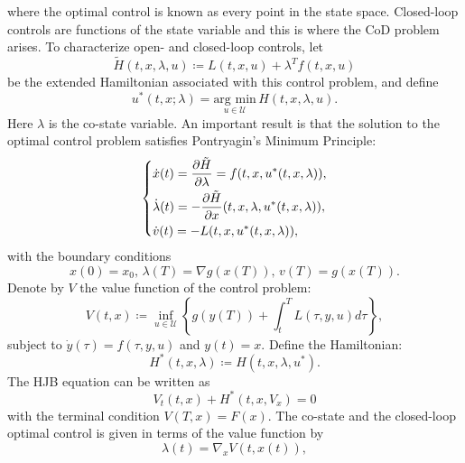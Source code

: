 \documentclass[12pt,AutoFakeBold,AutoFakeSlant]{article}
\theoremstyle{definition}
\newcommand{\bx}{{x}}
\newcommand{\be}{\begin{equation}}
\newcommand{\ee}{\end{equation}}
\newcommand{\del}{\partial}
\begin{document}
	where the optimal control is known as every point in the state space. Closed-loop controls are functions of the state variable
	and this is where the CoD problem arises.
	To characterize open- and closed-loop controls, let 
	\begin{equation}
	\label{eq: Hamiltonian}
	\tilde{ H} (t, x, \lambda, u) \coloneqq L (t, x, u) +  \lambda^T  f (t, x, u) 
	\end{equation}
	be the extended Hamiltonian associated with this control problem, and define
	\begin{equation} 
	\label{eq: optimal control as Hamiltonian minimizer}
	u^* (t, x; \lambda) = \underset{u \in \mathcal U}{\text{arg min}} \, H (t, x,  \lambda, u) .
	\end{equation}
	Here $\lambda$ is the co-state variable.  An important result is that the solution to the optimal control problem satisfies
	Pontryagin's Minimum Principle:
	\begin{equation}
	\label{eq:BVP}
	\begin{dcases*}
	\dot{x} (t) = \frac{\del \tilde{H}}{\del \lambda} = f (t, x, u^* (t, x, \lambda)) , \\
	\dot{\lambda} (t) = - \frac{\del \tilde{H}}{\del x} (t, x, \lambda, u^* (t, x, \lambda)) , \\
	\dot v (t) = - L (t, x, u^* (t, x, \lambda)) ,
	\end{dcases*}
	\end{equation}
	with the boundary conditions
	\begin{equation}
	\label{eq:BVP_BC}
	x (0) = x_0 , \,
	\lambda (T) = \nabla g(x (T)) , \,
	v (T) = g (x (T)).
	\end{equation}
	Denote by $V$ the value function of the control problem:
	\begin{equation}
	\label{eq: value function}
	V (t, x) \coloneqq \inf_{u \in \mathcal U} \left \{ g (y (T)) + \displaystyle \int_t^{T} L (\tau, y, u) d\tau \right \} ,
	\end{equation}
	subject to $\dot {y} (\tau) = f (\tau, y, u)$ and $y (t) = x$. 
	Define the Hamiltonian:
	\be
	H^* (t, x, \lambda) \coloneqq H (t, x, \lambda, u^*).
	\ee
	The HJB equation can be written as
	\begin{equation}
	\label{eq: HJB}
	V_t (t, x) + H^* \left( t, x, V_{x} \right) = 0 
	\end{equation}
	with the terminal condition $V (T, x) = F (x)$.
	The co-state and the closed-loop optimal control is given in terms of the value function by
	\begin{equation}
	\label{eq: costate as gradient}
	\lambda (t) = \nabla_{\bx} V (t, x(t)),
	\end{equation}
\end{document}
